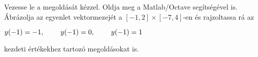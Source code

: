 Vezesse le a 
\de{} megoldását kézzel. 
Oldja meg a Matlab/Octave   segítségével is. 
Ábrázolja az egyenlet vektormezejét a $[-1,2]\times [-7,4]$-en és 
rajzoltassa rá 
az 
\centerline{$y(-1)=-1, \hspace{0.8cm} y(-1)=0, \hspace{0.8cm} y(-1)=1$} 
kezdeti értékekhez tartozó megoldásokat is.


